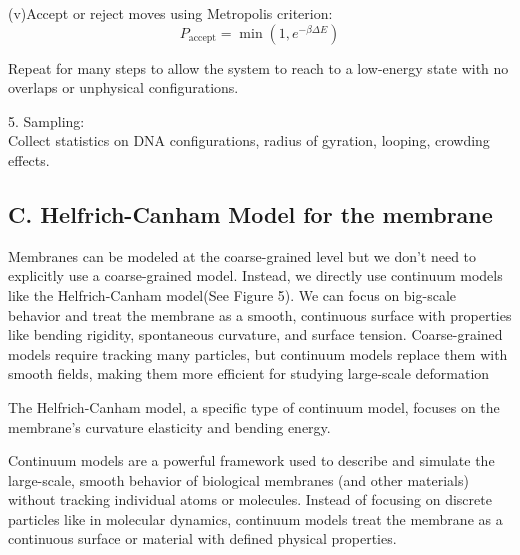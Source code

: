 \documentclass[12pt]{article}
\begin{document}
\begin{flushleft}
(v)Accept or reject moves using Metropolis criterion:
\begin{equation}
P_{\text{accept}} = \min \left(1, e^{-\beta \Delta E}\right)
\end{equation}

\setlength{\parindent}{0em}

\setlength{\parindent}{4em}
Repeat for many steps to allow the system to reach to a low-energy state with no overlaps or unphysical configurations.


\setlength{\parindent}{0em}

5. Sampling:\\
Collect statistics on DNA configurations, radius of gyration, looping, crowding effects.\\








\vspace{-1em} 
\subsection*{C. Helfrich-Canham Model for the membrane}
\setlength{\parindent}{30pt}

Membranes can be modeled at the coarse-grained level but we don't need to explicitly use a coarse-grained model. Instead, we directly use continuum models like the Helfrich-Canham model(See Figure 5). We can focus on big-scale behavior and treat the membrane as a smooth, continuous surface with properties like bending rigidity, spontaneous curvature, and surface tension. Coarse-grained models require tracking many particles, but continuum models replace them with smooth fields, making them more efficient for studying large-scale deformation








\setlength{\parindent}{30pt}
The Helfrich-Canham model, a specific type of continuum model, focuses on the membrane's curvature elasticity and bending energy\cite{Bassereau2014}.






Continuum models are a powerful framework used to describe and simulate the large-scale, smooth behavior of biological membranes (and other materials) without tracking individual atoms or molecules. Instead of focusing on discrete particles like in molecular dynamics, continuum models treat the membrane as a continuous surface or material with defined physical properties.


\end{flushleft}
\end{document}
